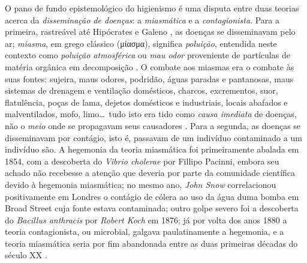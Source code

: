 O pano de fundo epistemológico do higienismo é uma disputa entre duas teorias acerca da \textit{disseminação de doenças}: a \textit{miasmática} e a \textit{contagionista}. Para a primeira, rastreável até Hipócrates e Galeno \cite{sterner_miasmic_2007}, as doenças se disseminavam pelo ar; \textit{miasma}, em grego clássico (\textgreek{μίασμα}), significa \textit{poluição}, entendida neste contexto como \textit{poluição atmosférica} ou \textit{mau odor} proveniente de partículas de matéria orgânica em decomposição \cite{mehlhorn2008encyclopedia}. O combate aos miasmas era o combate às suas fontes: sujeira, maus odores, podridão, águas paradas e pantanosas, maus sistemas de drenagem e ventilação domésticos, charcos, excrementos, suor, flatulência, poças de lama, dejetos domésticos e industriais, locais abafados e malventilados, mofo, limo\dots\ tudo isto era tido como \textit{causa imediata} de doenças, não o \textit{meio} onde se propagavam seus causadores \cite{baldwin_air_2003,halliday_miaslond_2001}. Para a segunda, as doenças se disseminavam por contágio, isto é, passavam de um indivíduo contaminado a um indivíduo são. A hegemonia da teoria miasmática foi primeiramente abalada em 1854, com a descoberta do \textit{Vibrio cholerae} por Fillipo Pacinni, embora seu achado não recebesse a atenção que deveria por parte da comunidade científica devido à hegemonia miasmática; no mesmo ano, \textit{John Snow} correlacionou positivamente em Londres o contágio de cólera ao uso da água duma bomba em Broad Street cuja fonte estava contaminada; outro golpe severo foi a descoberta do \textit{Bacillus anthracis} por \textit{Robert Koch} em 1876; já por volta dos anos 1880 a teoria contagionista, ou microbial, galgava paulatinamente a hegemonia, e a teoria miasmática seria por fim abandonada entre as duas primeiras décadas do século XX \cite{bynum_histmed_2011,mehlhorn2008encyclopedia}.

